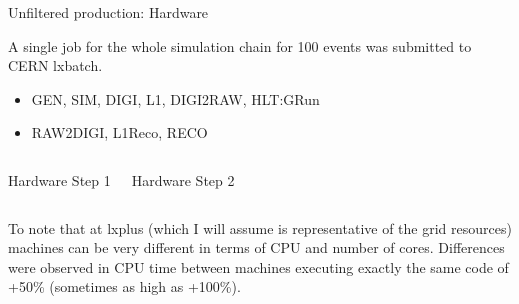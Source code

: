 \documentclass[8pt]{beamer}
\begin{document}
\begin{frame}{Unfiltered production: Hardware}

A single job for the whole simulation chain for 100 events was submitted to CERN lxbatch.
\begin{itemize}
  \item GEN, SIM, DIGI, L1, DIGI2RAW, HLT:GRun
  \item RAW2DIGI, L1Reco, RECO
\end{itemize}

\begin{columns}

  \centering
  
  \begin{block}{Hardware Step 1}
  
  \end{block}
  
  \centering
  
  \begin{block}{Hardware Step 2}
  
  \end{block}
  
\end{columns}


To note that at lxplus (which I will assume is representative of the grid resources) machines can be very different in terms of CPU and number of cores. Differences were observed in CPU time between machines executing exactly the same code of +50\% (sometimes as high as +100\%).

\end{frame}
\end{document}
